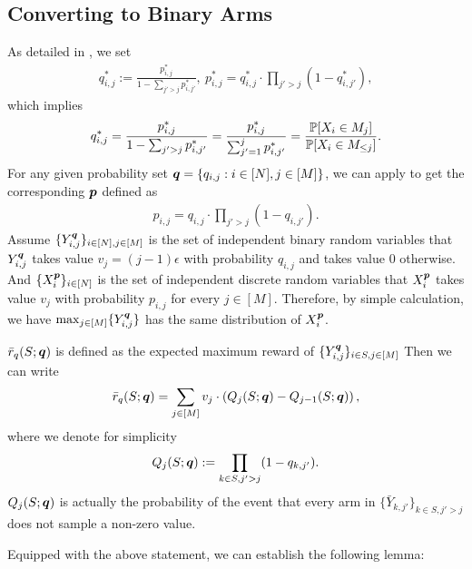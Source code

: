\subsection{Converting to Binary Arms}
As detailed in , we set
\begin{align*}
    q_{i,j}^* := \frac{p_{i,j}^*}{1 - \sum_{j' > j} p_{i,j'}^*}, \ p^*_{i,j} = q^*_{i,j} \cdot \prod_{j' > j} (1 - q^*_{i,j'}),
\end{align*}
which implies
\begin{align*}
    q^*_{i,j} = \frac{p^*_{i,j}}{1 - \sum_{j' > j} p^*_{i,j'}} = \frac{p^*_{i,j}}{\sum_{j'=1}^j p^*_{i,j'}} =
    \frac{{\mathbb{P}}[X_i \in M_j]}{{\mathbb{P}}[X_i \in M_{\le j}]}.
\end{align*} 
For any given probability set ${\bm{q}} = \{q_{i,j}: i \in [N], j \in [M]\}$, we can apply  to get the corresponding ${\bm{p}}$ defined as
\begin{align*}
    p_{i,j} = q_{i,j} \cdot \prod_{j' > j} (1 - q_{i,j'}).
\end{align*}
Assume $\{Y_{i,j}^{\bm{q}}\}_{i\in[N], j \in [M]}$ is the set of independent binary random variables that $Y_{i,j}^{\bm{q}}$ takes value $v_j = (j-1)\epsilon$ with probability $q_{i,j}$ and takes value $0$ otherwise. And $\{X_i^{\bm{p}}\}_{i\in[N]}$ is the set of independent discrete random variables that $X_i^{\bm{p}}$ takes value $v_j$ with probability $p_{i,j}$ for every $j \in [M]$. Therefore, by simple calculation, we have $\max_{j\in[M]}\{Y_{i,j}^{\bm{q}}\}$ has the same distribution of $X_i^{\bm{p}}$. 

$\bar r_q(S; {\bm{q}})$ is defined as the expected maximum reward of $\{Y_{i,j}^{\bm{q}}\}_{i\in S,j\in[M]}$ Then we can write
\begin{align}\label{eq:def-rq}
   \bar r_q(S; {\bm{q}}) = \sum_{j \in [M]} v_j \cdot \left( Q_j(S; {\bm{q}}) - Q_{j-1}(S;{\bm{q}})\right),
\end{align}
where we denote for simplicity
\begin{align}\label{eq:def-Qj}
    Q_j(S; {\bm{q}}):= \prod_{k \in S, j' > j} (1 - q_{k,j'}).
\end{align}
$Q_j(S; {\bm{q}})$ is actually the probability of the event that every arm in $\{\bar Y_{k,j'}\}_{k \in S, j' > j}$ does not sample a non-zero value.

Equipped with the above statement, we can establish the following lemma:

